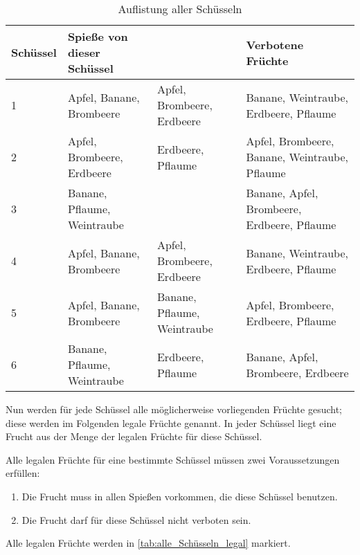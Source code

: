 \documentclass[a4paper,10pt,ngerman]{scrartcl}
\begin{document}
\begin{table}[ht]
    \begin{center}
        \begin{tabularx}{\linewidth}{l|X|X|X}
            \textbf{Schüssel} & \textbf{Spieße von dieser Schüssel} &                             & \textbf{Verbotene Früchte}                    \\
            \hline
            1                 & Apfel, Banane, Brombeere            & Apfel, Brombeere, Erdbeere  & Banane, Weintraube, Erdbeere, Pflaume         \\
            \hline
            2                 & Apfel, Brombeere, Erdbeere          & Erdbeere, Pflaume           & Apfel, Brombeere, Banane, Weintraube, Pflaume \\
            \hline
            3                 & Banane, Pflaume, Weintraube         &                             & Banane, Apfel, Brombeere, Erdbeere, Pflaume   \\
            \hline
            4                 & Apfel, Banane, Brombeere            & Apfel, Brombeere, Erdbeere  & Banane, Weintraube, Erdbeere, Pflaume         \\
            \hline
            5                 & Apfel, Banane, Brombeere            & Banane, Pflaume, Weintraube & Apfel, Brombeere, Erdbeere, Pflaume           \\
            \hline
            6                 & Banane, Pflaume, Weintraube         & Erdbeere, Pflaume           & Banane, Apfel, Brombeere, Erdbeere
        \end{tabularx}
        \caption{Auflistung aller Schüsseln}
        \label{tab:alle_Schüsseln}
    \end{center}
\end{table}

Nun werden für jede Schüssel alle möglicherweise vorliegenden Früchte gesucht; diese werden im Folgenden legale Früchte genannt.
In jeder Schüssel liegt eine Frucht aus der Menge der legalen Früchte für diese Schüssel.

Alle legalen Früchte für eine bestimmte Schüssel müssen zwei Voraussetzungen erfüllen:
\begin{enumerate}
    \item Die Frucht muss in allen Spießen vorkommen, die diese Schüssel benutzen.
    \item Die Frucht darf für diese Schüssel nicht verboten sein.
\end{enumerate}
Alle legalen Früchte werden in \autoref{tab:alle_Schüsseln_legal} markiert.
\end{document}
